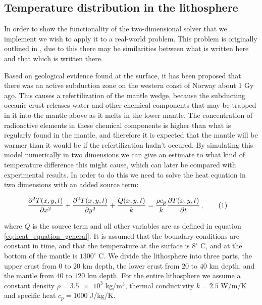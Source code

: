 \documentclass[reprint,english,notitlepage]{revtex4-1}  %
\newcommand\numberthis{\addtocounter{equation}{1}\tag{\theequation}}
\begin{document}
\subsection{Temperature distribution in the lithosphere} \label{sec:formalism_temp_dist_lithosphere}

In order to show the functionality of the two-dimensional solver that we implement we wish to apply it to a real-world problem. This problem is originally outlined in \cite[p.~4-5]{Hjorth-Jensen2020-p5}, due to this there may be similarities between what is written here and that which is written there. 

Based on geological evidence found at the surface, it has been proposed that there was an active subduction zone on the western coast of Norway about $1$ Gy ago. This causes a refertilization of the mantle wedge, because the subducting oceanic crust releases water and other chemical components that may be trapped in it into the mantle above as it melts in the lower mantle. The concentration of radioactive elements in these chemical components is higher than what is regularly found in the mantle, and therefore it is expected that the mantle will be warmer than it would be if the refertilization hadn't occured. By simulating this model numerically in two dimensions we can give an estimate to what kind of temperature difference this might cause, which can later be compared with experimental results. In order to do this we need to solve the heat equation in two dimensions with an added source term:

\begin{align*}
\frac{\partial^2 T(x,y,t)}{\partial x^2} + \frac{\partial^2 T(x,y,t)}{\partial y^2} + \frac{Q(x,y,t)}{k} &= \frac{\rho c_p}{k} \frac{\partial T(x,y,t)}{\partial t} \, , \numberthis \label{eq:heat_eq_with_source_term}
\end{align*} 

where $Q$ is the source term and all other variables are as defined in equation \eqref{eq:heat_equation_general}. It is assumed that the boundary conditions are constant in time, and that the temperature at the surface is $8^\circ$ C, and at the bottom of the mantle is $1300^\circ$ C. We divide the lithosphere into three parts, the upper crust from $0$ to $20$ km depth, the lower crust from $20$ to $40$ km depth, and the mantle from $40$ to $120$ km depth. For the entire lithosphere we assume a constant density $\rho = \num{3.5e3}$ kg/m$^3$, thermal conductivity $k = 2.5$ W/m/K and specific heat $c_p = 1000$ J/kg/K.
\end{document}
